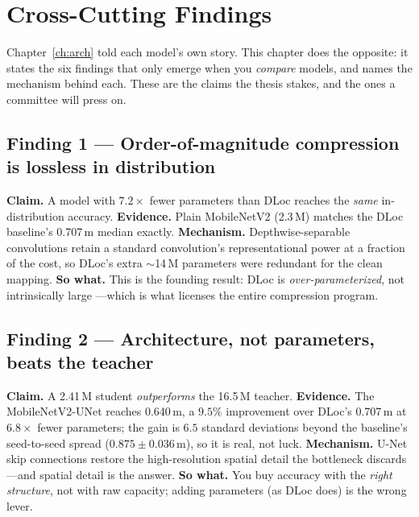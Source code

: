 \chapter{Cross-Cutting Findings}
\label{ch:findings}

Chapter~\ref{ch:arch} told each model's own story. This chapter does the opposite: it states the six
findings that only emerge when you \emph{compare} models, and names the mechanism behind each. These
are the claims the thesis stakes, and the ones a committee will press on.

\section{Finding 1 --- Order-of-magnitude compression is lossless in distribution}
\label{sec:find:1}

\textbf{Claim.} A model with $7.2\times$ fewer parameters than DLoc reaches the \emph{same}
in-distribution accuracy. \textbf{Evidence.} Plain MobileNetV2 (2.3\,M) matches the DLoc baseline's
0.707\,m median exactly. \textbf{Mechanism.} Depthwise-separable convolutions retain a standard
convolution's representational power at a fraction of the cost, so DLoc's extra $\sim$14\,M parameters
were redundant for the clean mapping. \textbf{So what.} This is the founding result: DLoc is
\emph{over-parameterized}, not intrinsically large ---which is what licenses the entire compression
program.

\section{Finding 2 --- Architecture, not parameters, beats the teacher}
\label{sec:find:2}

\textbf{Claim.} A 2.41\,M student \emph{outperforms} the 16.5\,M teacher. \textbf{Evidence.} The
MobileNetV2-UNet reaches 0.640\,m, a $9.5\%$ improvement over DLoc's 0.707\,m at $6.8\times$ fewer
parameters; the gain is $6.5$ standard deviations beyond the baseline's seed-to-seed spread
($0.875\pm0.036$\,m), so it is real, not luck. \textbf{Mechanism.} U-Net skip connections restore the
high-resolution spatial detail the bottleneck discards ---and spatial detail is the answer. \textbf{So
what.} You buy accuracy with the \emph{right structure}, not with raw capacity; adding parameters (as
DLoc does) is the wrong lever.

